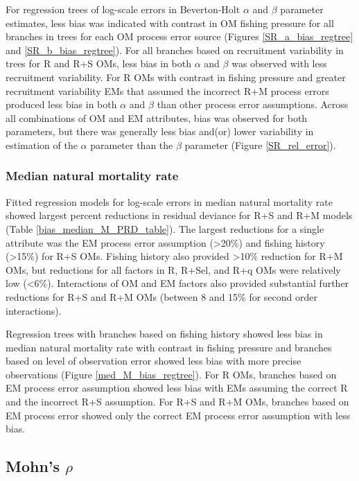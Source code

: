 \documentclass[
  12pt,
]{article}
\begin{document}
For regression trees of log-scale errors in Beverton-Holt \(\alpha\) and
\(\beta\) parameter estimates, less bias was indicated with contrast in
OM fishing pressure for all branches in trees for each OM process error
source (Figures \ref{SR_a_bias_regtree} and \ref{SR_b_bias_regtree}).
For all branches based on recruitment variability in trees for R and R+S
OMs, less bias in both \(\alpha\) and \(\beta\) was observed with less
recruitment variability. For R OMs with contrast in fishing pressure and
greater recruitment variability EMs that assumed the incorrect R+M
process errors produced less bias in both \(\alpha\) and \(\beta\) than
other process error assumptions. Across all combinations of OM and EM
attributes, bias was observed for both parameters, but there was
generally less bias and(or) lower variability in estimation of the
\(\alpha\) parameter than the \(\beta\) parameter (Figure
\ref{SR_rel_error}).

\subsubsection*{Median natural mortality
rate}\label{median-natural-mortality-rate}

Fitted regression models for log-scale errors in median natural
mortality rate showed largest percent reductions in residual deviance
for R+S and R+M models (Table \ref{bias_median_M_PRD_table}). The
largest reductions for a single attribute was the EM process error
assumption (\textgreater20\%) and fishing history (\textgreater15\%) for
R+S OMs. Fishing history also provided \textgreater10\% reduction for
R+M OMs, but reductions for all factors in R, R+Sel, and R+q OMs were
relatively low (\textless6\%). Interactions of OM and EM factors also
provided substantial further reductions for R+S and R+M OMs (between 8
and 15\% for second order interactions).

Regression trees with branches based on fishing history showed less bias
in median natural mortality rate with contrast in fishing pressure and
branches based on level of observation error showed less bias with more
precise observations (Figure \ref{med_M_bias_regtree}). For R OMs,
branches based on EM process error assumption showed less bias with EMs
assuming the correct R and the incorrect R+S assumption. For R+S and R+M
OMs, branches based on EM process error showed only the correct EM
process error assumption with less bias.

\subsection*{\texorpdfstring{Mohn's
\(\rho\)}{Mohn's \textbackslash rho}}\label{mohns-rho-1}
\end{document}
